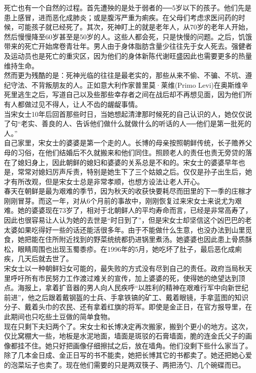 死亡也有一个自然的过程。首先遭殃的是处于弱者的──5岁以下的孩子。他们先是患上感冒，进而恶化成肺炎；或是腹泻严重为痢疾。在父母们考虑求医问药的时候，可能孩子就已经死了。其次，死神盯上的就是老年人，从70岁的老年人开始，然后慢慢降至60岁甚至是50岁的人。这些人都会死，只是快慢的问题。之后，饥饿带来的死亡开始席卷青壮年。男人由于身体脂肪含量少往往先于女人死去。强健者及运动员也是死亡的重灾区，因为他们的身体新陈代谢旺盛因此也需要更多的热量维持生命。\\

然而更为残酷的是：死神光临的往往是最老实的，那些从来不偷、不骗、不坑、遵纪守法、不背叛朋友的人。正如意大利作家普里莫·莱维(Primo Levi)在奥斯维辛死里逃生之后，写道自己以及些那些幸存者之间在战后却不再想见面，因为他们所有人都做过见不得人，让人不齿的龌龊事情。\\

当宋女士10年后回首那些时日，当她想起清津那时候死的自己认识的人，她仅仅说了句“老实、善良的人、告诉他们做什么就做什么的听话的人──他们是第一批死的人。”\\

自己家里，宋女士的婆婆是第一个走的人。长博的母亲按照朝鲜传统，长子赡养父母的习俗，在他们结婚后不久就搬来和他们同住。照顾老人的责任也责无旁贷的落在了媳妇身上，因此朝鲜的媳妇和婆婆的关系总是不和的。宋女士的婆婆早年也是，常常对媳妇厉声斥责，特别是她生下了三个姑娘之后。仅仅是孙子出生后，她才有所改观，但是宋女士总是非常孝顺，也想方设法让老人开心。\\

春天在朝鲜是最为艰难的季节，因为秋天的收获快要耗尽而田里的下一季的庄稼才刚刚冒芽。而这一年，对从6个月前的事故中，刚刚恢复过来宋女士来说尤为艰难。她的婆婆现在73岁了，相对于北朝鲜人的平均寿命而言，已经是非常高寿了，因此也很容易让人认为她的去世是“时日到了”，但是宋女士却坚信这个凶巴巴的老太婆如果吃得好一些的话还能活很多年。由于不能做什么生意，也没办法到山里觅食，她把能在住所附近找到的野菜统统都扔进锅里煮汤。她婆婆也因此患上骨质酥松，眼睛周围也出现玉蜀黍疹。在1996年的5月，她吃坏了肚子，最后恶化成痢疾，几天后就去世了。\\

宋女士以一种朝鲜妇女可能的，最失败的方式没有尽到自己的责任。政府当局秋天里呼吁所有市民努力工作渡过难关的宣传，加上婆婆的死，使得她的绝望达到顶点。海报上，拿着扩音器的男人向人民疾呼“以胜利的精神在艰难行军中向新世纪前进”，他之后跟着戴钢盔的士兵、手拿铁镐的矿工、戴着眼镜，手拿蓝图的知识分子、戴着头巾的农民、还有拿着红旗的将军。即使是金正日，在官方报导里，在此期间也只吃些土豆做的简单食物。\\

现在只剩下夫妇两个了。宋女士和长博决定再次搬家，搬到个更小的地方。这次，仅比窝棚大一些，地板是水泥地面，墙面是斑驳的石膏墙面，脆的连金氏父子的画像都挂不住。她只好把画像仔细擦拭之后，放在墙角。他们没剩下些什么家当了。除了几本金日成、金正日写的书不能卖，她把长博其它的书都卖了。她还把她心爱的泡菜坛子也卖了。现在他们需要的只是两双筷子、两把汤勺、几个碗碟而已。\\

